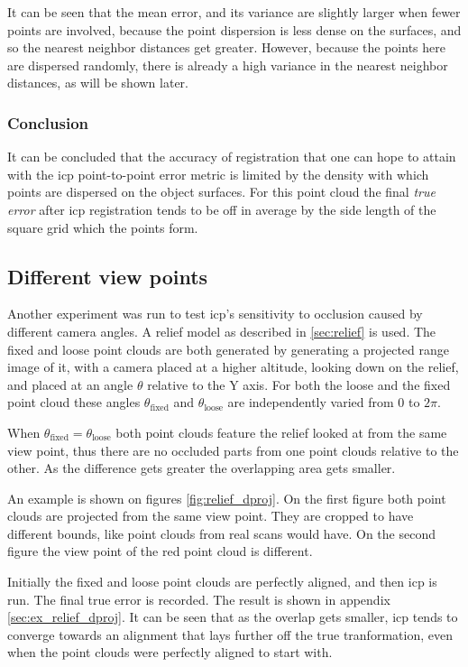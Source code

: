 It can be seen that the mean error, and its variance are slightly larger when fewer points are involved, because the point dispersion is less dense on the surfaces, and so the nearest neighbor distances get greater. However, because the points here are dispersed randomly, there is already a high variance in the nearest neighbor distances, as will be shown later.

\subsubsection{Conclusion}
It can be concluded that the accuracy of registration that one can hope to attain with the \gls{icp} point-to-point error metric is limited by the density with which points are dispersed on the object surfaces. For this point cloud the final \emph{true error} after \gls{icp} registration tends to be off in average by the side length of the square grid which the points form.


\subsection{Different view points}
Another experiment was run to test \gls{icp}'s sensitivity to occlusion caused by different camera angles. A relief model as described in \ref{sec:relief} is used. The fixed and loose point clouds are both generated by generating a projected range image of it, with a camera placed at a higher altitude, looking down on the relief, and placed at an angle $\theta$ relative to the Y axis. For both the loose and the fixed point cloud these angles $\theta_{\text{fixed}}$ and $\theta_{\text{loose}}$ are independently varied from $0$ to $2 \pi$.

When $\theta_{\text{fixed}} = \theta_{\text{loose}}$ both point clouds feature the relief looked at from the same view point, thus there are no occluded parts from one point clouds relative to the other. As the difference gets greater the overlapping area gets smaller.

An example is shown on figures \ref{fig:relief_dproj}. On the first figure both point clouds are projected from the same view point. They are cropped to have different bounds, like point clouds from real scans would have. On the second figure the view point of the red point cloud is different.

Initially the fixed and loose point clouds are perfectly aligned, and then \gls{icp} is run. The final true error is recorded. The result is shown in appendix \ref{sec:ex_relief_dproj}. It can be seen that as the overlap gets smaller, \gls{icp} tends to converge towards an alignment that lays further off the true tranformation, even when the point clouds were perfectly aligned to start with.

